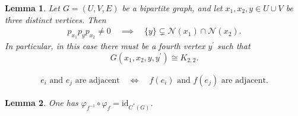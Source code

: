 \documentclass[10pt,a4paper]{amsart}
\newtheorem{lemma}{Lemma}
\begin{document}
\begin{lemma}
    \label{bga::lemma:nontrivial_p_x2 p_y p_x2_and_K22_subgraph}
    Let $G = (U, V, E)$ be a bipartite graph, and let $x_1, x_2, y \in U \cup V$ be three distinct vertices. Then 
    \begin{align*}
        p_{x_1} p_y p_{x_2} \neq 0
        \quad \implies \quad 
        \{y\} \subsetneq \mathcal{N}(x_1) \cap \mathcal{N}(x_2).
    \end{align*}
    In particular, in this case there must be a fourth vertex $y^\prime$ such that 
    $$
    G(x_1, x_2, y, y^\prime) \cong K_{2,2}.
    $$
\end{lemma}

    \begin{align}
        \label{reps::eq:f_preserves_adjacency}
        e_i \text{ and } e_j \text{ are adjacent} \quad\Leftrightarrow\quad f(e_i) \text{ and } f(e_j) \text{ are adjacent}.
    \end{align}

\begin{lemma} 
    \label{class::lemma:phi_is_invertible}
    One has $\varphi_{f^{-1}} \circ \varphi_f = \mathrm{id}_{C^\ast(G)}$.
\end{lemma}
\end{document}
